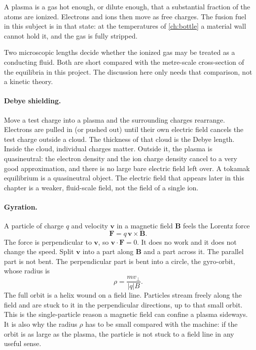 \documentclass[11pt,a4paper,oneside,openany]{book}
\numberwithin{equation}{chapter}
\theoremstyle{definition}
\begin{document}
A plasma is a gas hot enough, or dilute enough, that a substantial fraction of the atoms are ionized. Electrons and ions then move as free charges. The fusion fuel in this subject is in that state: at the temperatures of \cref{ch:bottle} a material wall cannot hold it, and the gas is fully stripped.

Two microscopic lengths decide whether the ionized gas may be treated as a conducting fluid. Both are short compared with the metre-scale cross-section of the equilibria in this project. The discussion here only needs that comparison, not a kinetic theory.

\paragraph{Debye shielding.}
Move a test charge into a plasma and the surrounding charges rearrange. Electrons are pulled in (or pushed out) until their own electric field cancels the test charge outside a cloud. The thickness of that cloud is the Debye length. Inside the cloud, individual charges matter. Outside it, the plasma is quasineutral: the electron density and the ion charge density cancel to a very good approximation, and there is no large bare electric field left over. A tokamak equilibrium is a quasineutral object. The electric field that appears later in this chapter is a weaker, fluid-scale field, not the field of a single ion.

\paragraph{Gyration.}
A particle of charge \(q\) and velocity \(\mathbf{v}\) in a magnetic field \(\mathbf{B}\) feels the Lorentz force
\begin{equation}
\label{eq:lorentz}
\mathbf{F}=q\,\mathbf{v}\times\mathbf{B}.
\end{equation}
The force is perpendicular to \(\mathbf{v}\), so \(\mathbf{v}\cdot\mathbf{F}=0\). It does no work and it does not change the speed. Split \(\mathbf{v}\) into a part along \(\mathbf{B}\) and a part across it. The parallel part is not bent. The perpendicular part is bent into a circle, the gyro-orbit, whose radius is
\begin{equation}
\label{eq:gyro}
\rho=\frac{m v_{\perp}}{\lvert q\rvert B}.
\end{equation}
The full orbit is a helix wound on a field line. Particles stream freely along the field and are stuck to it in the perpendicular directions, up to that small orbit. This is the single-particle reason a magnetic field can confine a plasma sideways. It is also why the radius \(\rho\) has to be small compared with the machine: if the orbit is as large as the plasma, the particle is not stuck to a field line in any useful sense.
\end{document}
